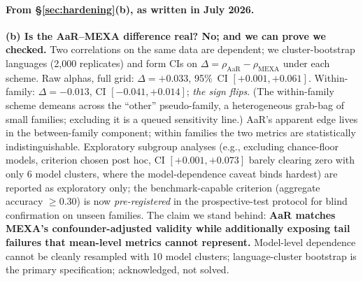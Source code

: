 \documentclass[11pt,a4paper]{article}
\begin{document}
\paragraph{From \S\ref{sec:hardening}(b), as written in July 2026.}
\textbf{(b) Is the AaR--MEXA difference real? No; and we can prove we
checked.} Two correlations on the same data are dependent; we
cluster-bootstrap languages (2,000 replicates) and form CIs on
$\Delta = \rho_{\mathrm{AaR}} - \rho_{\mathrm{MEXA}}$ under each scheme.
Raw alphas, full grid: $\Delta = +0.033$, 95\%~CI $[+0.001, +0.061]$.
Within-family: $\Delta = -0.013$, CI $[-0.041, +0.014]$; \emph{the sign
flips}. (The within-family scheme demeans across the ``other'' pseudo-family,
a heterogeneous grab-bag of small families; excluding it is a queued
sensitivity line.) AaR's apparent edge lives in the between-family component;
within families the two metrics are statistically indistinguishable. Exploratory
subgroup analyses (e.g., excluding chance-floor models, criterion chosen
post hoc, CI $[+0.001, +0.073]$ barely clearing zero with only 6 model
clusters, where the model-dependence caveat binds hardest) are reported as
exploratory only; the benchmark-capable criterion (aggregate accuracy $\geq 0.30$)
is now \emph{pre-registered} in the prospective-test protocol for blind
confirmation on unseen families. The claim we stand behind:
\textbf{AaR matches MEXA's confounder-adjusted validity while additionally exposing
tail failures that mean-level metrics cannot represent.} Model-level
dependence cannot be cleanly resampled with 10 model clusters;
language-cluster bootstrap is the primary specification; acknowledged,
not solved.
\end{document}

